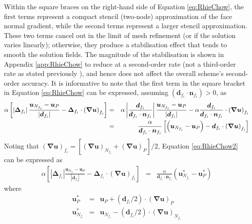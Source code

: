 \documentclass[sn-mathphys,Numbered]{sn-jnl}%
\newcommand{\bb}{\boldsymbol}
\begin{document}
Within the square braces on the right-hand side of Equation \ref{eq:RhieChow}, the first terms represent a compact stencil (two-node) approximation of the face normal gradient, while the second terms represent a larger stencil approximation.
These two terms cancel out in the limit of mesh refinement (or if the solution varies linearly); otherwise, they produce a stabilisation effect that tends to smooth the solution fields.
The magnitude of the stabilisation is shown in Appendix \ref{app:RhieChow} to reduce at a second-order rate (not a third-order rate as stated previously \citep{Demirdzic1995}), and hence does not affect the overall scheme's second-order accuracy.
It is informative to note that the first term in the square bracket in Equation \ref{eq:RhieChow} can be expressed, assuming $(\bb{d}_{f_i} \cdot \bb{n}_{f_i}) > 0$, as
\begin{eqnarray} \label{eq:RhieChow2}
	\alpha \left[ \left|\bb{\Delta}_{f_i} \right| \frac{ \bb{u}_{N_{f_i}} - \bb{u}_P}{\left|\bb{d}_{f_i}\right|}	-  \bb{\Delta}_{f_i} \cdot \left(\bb{\nabla} \bb{u} \right)_{f_i} \right]
	&=&
	\alpha \left| \frac{\bb{d}_{f_i}}{\bb{d}_{f_i} \cdot \bb{n}_{f_i}} \right| \frac{ \bb{u}_{N_{f_i}} - \bb{u}_P}{\left|\bb{d}_{f_i}\right|}
	-  \alpha \frac{\bb{d}_{f_i}}{\bb{d}_{f_i} \cdot \bb{n}_{f_i}} \cdot \left(\bb{\nabla} \bb{u} \right)_{f_i} \notag \\
	&=&
	\frac{\alpha}{\bb{d}_{f_i} \cdot \bb{n}_{f_i}} \left[ \left( \bb{u}_{N_{f_i}} - \bb{u}_P \right) -  \bb{d}_{f_i} \cdot \left(\bb{\nabla} \bb{u} \right)_{f_i} \right]
\end{eqnarray}
Noting that $\left(\bb{\nabla} \bb{u} \right)_{f_i} = \left[ \left(\bb{\nabla} \bb{u} \right)_{N_{f_i}} + \left(\bb{\nabla} \bb{u} \right)_P \right]/2$, Equation \ref{eq:RhieChow2} can be expressed as
\begin{eqnarray}
	\alpha \left[ \left|\bb{\Delta}_{f_i} \right| \frac{ \bb{u}_{N_{f_i}} - \bb{u}_P}{\left|\bb{d}_{f_i}\right|}	-  \bb{\Delta}_{f_i} \cdot \left(\bb{\nabla} \bb{u} \right)_{f_i} \right]
	&=&
	\frac{\alpha}{\bb{d}_{f_i} \cdot \bb{n}_{f_i}} \left( \bb{u}_{N_{f_i}}^* - \bb{u}_P^* \right)
\end{eqnarray}
where
\begin{eqnarray}
	\bb{u}_P^* &=& \bb{u}_P + (\bb{d}_{f_i}/2) \cdot \left(\bb{\nabla} \bb{u} \right)_P  \\
	\bb{u}_{N_{f_i}}^* &=& \bb{u}_{N_{f_i}} - (\bb{d}_{f_i}/2) \cdot \left(\bb{\nabla} \bb{u} \right)_{N_{f_i}}
\end{eqnarray}
\end{document}
